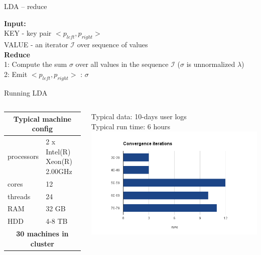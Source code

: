 \documentclass[aspectratio=1610]{beamer}
\begin{document}
\begin{frame}[fragile]{LDA -- reduce}

\begin{small}

{\bf Input:} \\
KEY - key pair $<p_{left}, p_{right} >$ \\
VALUE - an iterator $\mathcal{I}$ over sequence of values \\
{\bf Reduce} \\
1: Compute the sum $\sigma$ over all values in the sequence $\mathcal{I}$ ($\sigma$ is
unnormalized $\lambda$) \\
2: Emit  $<p_{left}, p_{right} >$ : $\sigma$

\end{small}

\end{frame}

\begin{frame}{Running LDA}


\begin{columns}[C]
    \begin{column}{.5\textwidth} 
    \vspace{2em}
  \begin{tabular}{ |l|l| }
  \hline
  \multicolumn{2}{|c|}{\bf Typical machine config} \\  
  \hline \hline
  processors & 2 x Intel(R) Xeon(R) 2.00GHz \\
  cores & 12 \\
  threads & 24 \\
  RAM & 32 GB \\
  HDD & 4-8 TB \\
  \hline \hline
  \multicolumn{2}{|c|}{\bf 30 machines in cluster} \\
  \hline
  \end{tabular}
    \end{column}
    \begin{column}{.5\textwidth} 
    Typical data: 10-days user logs \\
    Typical run time: 6 hours \\
    \includegraphics[scale=0.33]{images/iterations.png}   
    \end{column}    
\end{columns}

\end{frame}
\end{document}
